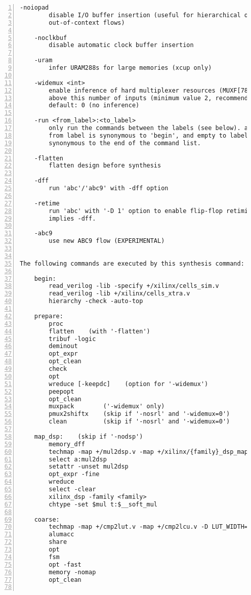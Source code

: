\begin{lstlisting}[numbers=left,frame=single]
    -noiopad
        disable I/O buffer insertion (useful for hierarchical or 
        out-of-context flows)

    -noclkbuf
        disable automatic clock buffer insertion

    -uram
        infer URAM288s for large memories (xcup only)

    -widemux <int>
        enable inference of hard multiplexer resources (MUXF[78]) for muxes at or
        above this number of inputs (minimum value 2, recommended value >= 5).
        default: 0 (no inference)

    -run <from_label>:<to_label>
        only run the commands between the labels (see below). an empty
        from label is synonymous to 'begin', and empty to label is
        synonymous to the end of the command list.

    -flatten
        flatten design before synthesis

    -dff
        run 'abc'/'abc9' with -dff option

    -retime
        run 'abc' with '-D 1' option to enable flip-flop retiming.
        implies -dff.

    -abc9
        use new ABC9 flow (EXPERIMENTAL)


The following commands are executed by this synthesis command:

    begin:
        read_verilog -lib -specify +/xilinx/cells_sim.v
        read_verilog -lib +/xilinx/cells_xtra.v
        hierarchy -check -auto-top

    prepare:
        proc
        flatten    (with '-flatten')
        tribuf -logic
        deminout
        opt_expr
        opt_clean
        check
        opt
        wreduce [-keepdc]    (option for '-widemux')
        peepopt
        opt_clean
        muxpack        ('-widemux' only)
        pmux2shiftx    (skip if '-nosrl' and '-widemux=0')
        clean          (skip if '-nosrl' and '-widemux=0')

    map_dsp:    (skip if '-nodsp')
        memory_dff
        techmap -map +/mul2dsp.v -map +/xilinx/{family}_dsp_map.v {options}
        select a:mul2dsp
        setattr -unset mul2dsp
        opt_expr -fine
        wreduce
        select -clear
        xilinx_dsp -family <family>
        chtype -set $mul t:$__soft_mul

    coarse:
        techmap -map +/cmp2lut.v -map +/cmp2lcu.v -D LUT_WIDTH=[46]
        alumacc
        share
        opt
        fsm
        opt -fast
        memory -nomap
        opt_clean


\end{lstlisting}
